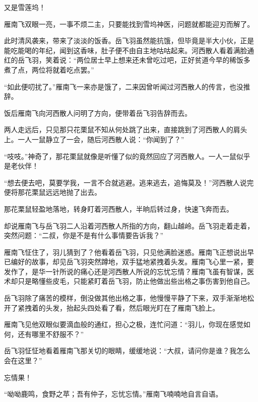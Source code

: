 又是雪莲坞！

雁南飞双眼一亮，一事不烦二主，只要能找到雪坞神医，问题就都能迎刃而解了。

此时清风袭来，带来了淡淡的饭香。岳飞羽虽然能抗饿，但毕竟是半大小伙，正是能吃能喝的年纪，闻到这香味，肚子便不由自主地咕咕起来。河西散人看着满脸通红的岳飞羽，笑着说：“两位居士早上想来还未曾吃过吧，正好贫道今早的稀饭多煮了点，两位将就着吃点罢。”

“如此便叨扰了。”雁南飞一来亦是饿了，二来因曾听闻过河西散人的传言，也没推辞。

饭后雁南飞向河西散人问明了方向，便带着岳飞羽告辞而去。

两人走远后，只见那只花栗鼠不知从何处跳了出来，直接跳到了河西散人的肩头上。一人一鼠静立了一会，随后河西散人说：“你闻到了？”

“吱吱。”神奇了，那花栗鼠就像是听懂了似的竟然回应了河西散人。一人一鼠似乎是老伙伴！

“想去便去吧，莫要学我，一言不合就逃避。逃来逃去，追悔莫及！”河西散人说完便将那花栗鼠远远地抛了出去。

那花栗鼠轻盈地落地，转身盯着河西散人，半晌后转过身，快速飞奔而去。

却说雁南飞与岳飞羽二人沿着河西散人所指的方向，翻山越岭。岳飞羽走着走着，突然问题：“二叔，你是不是有什么事情要告诉我？”

雁南飞怔住了，羽儿猜到了？他看着岳飞羽，只见他满脸迷惑。雁南飞正想说出早已编好的故事，却见岳飞羽突然蹲地，双手猛地紧拽着头发。雁南飞心里一紧，要发作了，是华一针所说的痛心还是河西散人所说的忘忧忘情？雁南飞虽有智谋，医术却只是略懂些皮毛，只能紧盯着岳飞羽，防止他做出些出格之事伤害到他自己。

岳飞羽除了痛苦的模样，倒没做其他出格之事，他慢慢平静了下来，双手渐渐地松开了紧拽着的头发，抬起头四处看了看，然后眼光盯在了雁南飞脸上。

雁南飞见他双眼似要滴血般的通红，担心之极，连忙问道：“羽儿，你现在感觉如何，还有哪里不舒服不？”

岳飞羽怔怔地看着雁南飞那关切的眼睛，缓缓地说：“大叔，请问你是谁？我怎么会在这里？”

忘情果！

“呦呦鹿鸣，食野之苹；吾有仲子，忘忧忘情。”雁南飞喃喃地自言自语。


